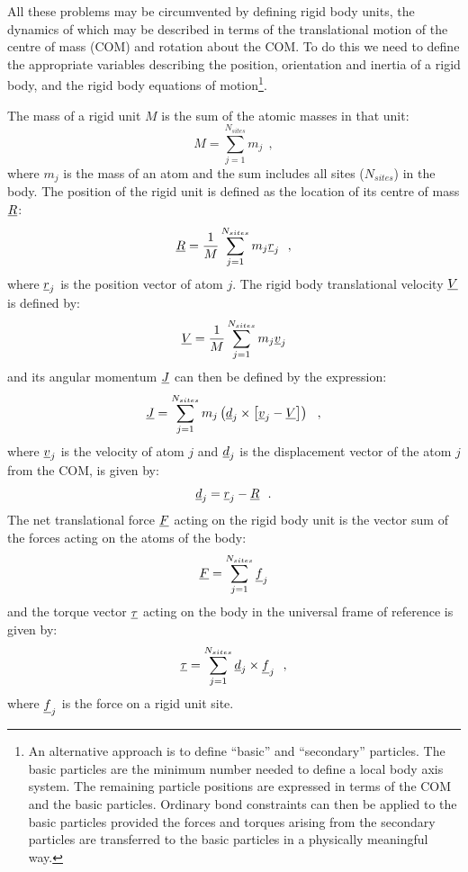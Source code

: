 All these problems may be circumvented by defining rigid body
units, the dynamics of which may be described in terms of
the translational motion of the centre of mass (COM) and rotation
about the COM. To do this we need to define the appropriate variables
describing the position, orientation and inertia of a
rigid body, and the rigid body
equations of motion\footnote{An alternative approach is to define
``basic'' and ``secondary'' particles.  The basic particles are the
minimum number needed to define a local body axis system.  The
remaining particle positions are expressed in terms of the COM and
the basic particles. Ordinary bond constraints
can then be applied to the basic particles provided the forces
and torques arising from the secondary particles are transferred
to the basic particles in a physically meaningful way.}.

The mass of a rigid unit $M$ is the sum of the atomic masses in that unit:
\begin{equation}
M = \sum_{j=1}^{N_{sites}} m_{j}~~, \label{netmass}
\end{equation}
where $m_{j}$ is the mass of an atom and the sum includes all sites
($N_{sites}$) in the body.  The position of the rigid unit is defined
as the location of its centre of mass $\mbox{$\underline{R}$}$:
\begin{equation}
\mbox{$\underline{R}$} = {1 \over M}\sum_{j=1}^{N_{sites}} m_{j} \mbox{$\underline{r}$}_{j}~~,
\end{equation}
where $\mbox{$\underline{r}$}_{j}$ is the position vector of atom $j$.  The rigid body
translational velocity $\mbox{$\underline{V}$}$ is defined by:
\begin{equation}
\mbox{$\underline{V}$} = {1 \over M}\sum_{j=1}^{N_{sites}} m_{j} \mbox{$\underline{v}$}_{j}
\end{equation}
and its angular momentum $\mbox{$\underline{J}$}$ can then be
defined by the expression:
\begin{equation}
\mbox{$\underline{J}$} = \sum_{j=1}^{N_{sites}} m_{j} \left( \mbox{$\underline{d}$}_{j} \times \left[ \mbox{$\underline{v}$}_{j} - \mbox{$\underline{V}$} \right] \right)~~,
\end{equation}
where $\mbox{$\underline{v}$}_{j}$ is the velocity of atom $j$ and $\mbox{$\underline{d}$}_{j}$ is
the displacement vector of the atom $j$ from the COM, is given by:
\begin{equation}
\mbox{$\underline{d}$}_{j}=\mbox{$\underline{r}$}_{j}-\mbox{$\underline{R}$}~~.
\end{equation}
The net translational force $\mbox{$\underline{F}$}$ acting on the rigid body unit is
the vector sum of the forces acting on the atoms of the body:
\begin{equation}
\mbox{$\underline{F}$} = \sum_{j=1}^{N_{sites}} \mbox{$\underline{f}$}_{j} \label{netforce}
\end{equation}
and the torque vector $\mbox{$\underline{\tau}$}$ acting on the body in the
universal frame of reference is given by:
\begin{equation}
\mbox{$\underline{\tau}$} = \sum_{j=1}^{N_{sites}} \mbox{$\underline{d}$}_{j} \times \mbox{$\underline{f}$}_{j}~~,\label{nettorque}
\end{equation}
where $\mbox{$\underline{f}$}_{j}$ is the force on a rigid unit site.

